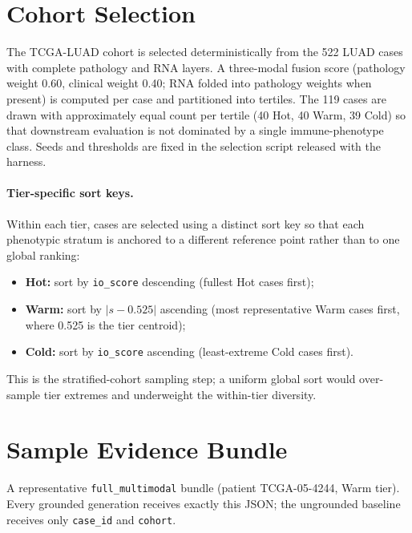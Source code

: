 \documentclass{article}
\theoremstyle{plain}
\begin{document}
\section{Cohort Selection}
\label{app:cohort}

The TCGA-LUAD cohort is selected deterministically from the 522 LUAD cases with complete pathology and RNA layers. A three-modal fusion score (pathology weight 0.60, clinical weight 0.40; RNA folded into pathology weights when present) is computed per case and partitioned into tertiles. The 119 cases are drawn with approximately equal count per tertile (40 Hot, 40 Warm, 39 Cold) so that downstream evaluation is not dominated by a single immune-phenotype class. Seeds and thresholds are fixed in the selection script released with the harness.

\paragraph{Tier-specific sort keys.} Within each tier, cases are selected using a distinct sort key so that each phenotypic stratum is anchored to a different reference point rather than to one global ranking:
\begin{itemize}
\item \textbf{Hot:} sort by \texttt{io\_score} descending (fullest Hot cases first);
\item \textbf{Warm:} sort by $|s - 0.525|$ ascending (most representative Warm cases first, where 0.525 is the tier centroid);
\item \textbf{Cold:} sort by \texttt{io\_score} ascending (least-extreme Cold cases first).
\end{itemize}
This is the stratified-cohort sampling step; a uniform global sort would over-sample tier extremes and underweight the within-tier diversity.

\section{Sample Evidence Bundle}
\label{app:bundle}

A representative \texttt{full\_multimodal} bundle (patient TCGA-05-4244, Warm tier). Every grounded generation receives exactly this JSON; the ungrounded baseline receives only \texttt{case\_id} and \texttt{cohort}.
\end{document}

